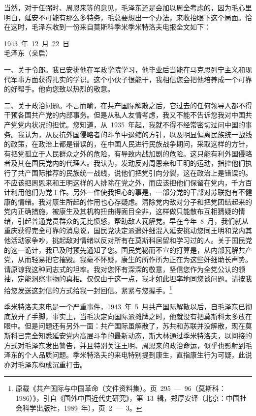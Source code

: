 当然，对于任弼时、周恩来等的意见，毛泽东还是会加以周全考虑的，因为毛心里明白，延安不可能有那么多特务，毛总要想出一个办法，来收抬眼下这个局面。恰在这时，毛泽东收到一份来自莫斯科季米季米特洛夫电报全文如下：
\begin{quoting}
1943~年~12~月~22~日\\毛泽东（亲启）

一、关于令郎。我已安排他在军政学院学习，他毕业后当能在马克思列宁主义和现代军事方面获得扎实的学识。这个小伙子很能干，我相信您会把他培养成一个可靠的好帮手。他向您致以热烈的敬意。

二、关于政治问题。不言而喻，在共产国际解散之后，它过去的任何领导人都不得干预各国共产党的内部事务。但是从私人友情考虑，我又不能不告诉您我对中国共产党党内状况的担忧。您知道，从~1935~年起，我就不得不经常密切过问中国的事务。我认为，从反抗外国侵略者的斗争中退缩的方针，以及明显偏离民族统一战线的政策，在政治上都是错误的，在中国人民进行民族战争期问，采取这样的方针，有把党孤立于人民群众之外的危险，有导致内战加剧的危险。这只能有利外国侵略者及其在国民党内的代理人。我认为，发动反对周恩来和王明的运动，指控他们执行了共产国际推荐的民族统一战线，说他们把党引向分裂，这在政治上是错误的。不应该把周恩来和王明这样的人排除在党之外，而应该把他们保留在党内，千方百计利用他们为党工作。另外一件使我担心的事是，一部分党的干部对苏联抱有不健康的情绪。我对康生所起的作用也心存疑虑。清除党内敌对分子和把党团结起来的党内正确措施，被康生及其机构扭曲得面目全非，这样做只能散布互相猜疑的情绪，引起普通党员群众的无比愤怒，帮助敌人瓦解党。早在今年~8~月，我们就从重庆获得完全可靠的消息说，国民党决定派遣奸细混入延安挑动您同王明和党内其他活动家争吵，挑起敌对情绪以反对所有在莫斯科居留和学习过的人。关于国民党的这一诡计，我已及时预先通知了您。国民党秘而不宣的打算是，从内部瓦解共产党，从而轻易把它摧毁。我毫不怀疑，康生的所作所为正在为这些奸细助长声势。请原谅我这种同志式的坦率。我对您怀有深深的敬意，坚信您作为全党公认的领袖，定能洞察事物的真相。仅仅由于这一点，我才如此坦率地同您谈问题。请按我给您发送这封信的方式给我一封回信。紧紧与您握手。\footnote{原载《共产国际与中国革命（文件资料集）。页~295~—~96（莫斯科：1986）》，引自《国外中国近代史研究》，第~13~辑，郑厚安译（北京：中国社会科学出版社，1989~年），页~2~—~3。}
\end{quoting}

季米特洛夫来电是一个严重事件，1943~年~5~月共产国际解散以后，自毛泽东已彻底放开了手脚，事实上，当毛决定向国际派摊牌之时，他就没有把莫斯科太多放在眼中。但是问题还有另外一面：共产国际虽解散了，苏共和苏联并没解散，现在莫斯科已完全知悉延安党内高层斗争的最新动态，斯大林通过季米特洛夫，以间接的方式对毛泽东发出警告，并且特别关注王明、周恩来的政治命运，似乎也影射到毛泽东的个人品质问题。季米特洛夫的来电特别提到康生，直指康生行为可疑，此说亦对毛泽东构成沉重打击。

